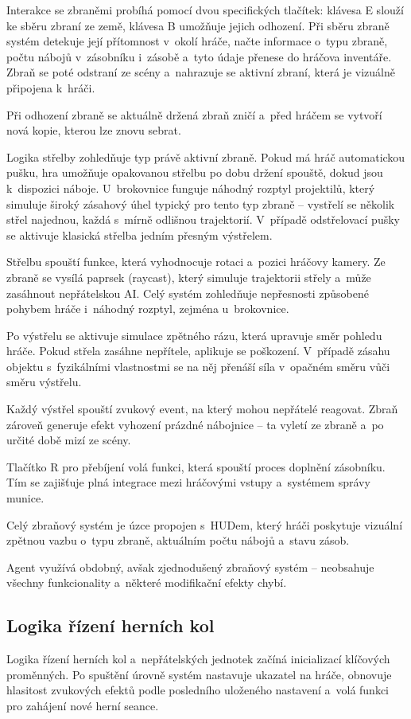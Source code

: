 Interakce se zbraněmi probíhá pomocí dvou specifických tlačítek: klávesa E slouží ke sběru zbraní ze země, klávesa B umožňuje jejich odhození. Při sběru zbraně systém detekuje její přítomnost v~okolí hráče, načte informace o~typu zbraně, počtu nábojů v~zásobníku i~zásobě a~tyto údaje přenese do hráčova inventáře. Zbraň se poté odstraní ze scény a~nahrazuje se aktivní zbraní, která je vizuálně připojena k~hráči.

Při odhození zbraně se aktuálně držená zbraň zničí a~před hráčem se vytvoří nová kopie, kterou lze znovu sebrat.

Logika střelby zohledňuje typ právě aktivní zbraně. Pokud má hráč automatickou pušku, hra umožňuje opakovanou střelbu po dobu držení spouště, dokud jsou k~dispozici náboje. U~brokovnice funguje náhodný rozptyl projektilů, který simuluje široký zásahový úhel typický pro tento typ zbraně – vystřelí se několik střel najednou, každá s~mírně odlišnou trajektorií. V~případě odstřelovací pušky se aktivuje klasická střelba jedním přesným výstřelem.

Střelbu spouští funkce, která vyhodnocuje rotaci a~pozici hráčovy kamery. Ze zbraně se vysílá paprsek (raycast), který simuluje trajektorii střely a~může zasáhnout nepřátelskou AI. Celý systém zohledňuje nepřesnosti způsobené pohybem hráče i~náhodný rozptyl, zejména u~brokovnice.

Po výstřelu se aktivuje simulace zpětného rázu, která upravuje směr pohledu hráče. Pokud střela zasáhne nepřítele, aplikuje se poškození. V~případě zásahu objektu s~fyzikálními vlastnostmi se na něj přenáší síla v~opačném směru vůči směru výstřelu.

Každý výstřel spouští zvukový event, na který mohou nepřátelé reagovat. Zbraň zároveň generuje efekt vyhození prázdné nábojnice – ta vyletí ze zbraně a~po určité době mizí ze scény.

Tlačítko R pro přebíjení volá funkci, která spouští proces doplnění zásobníku. Tím se zajišťuje plná integrace mezi hráčovými vstupy a~systémem správy munice.

Celý zbraňový systém je úzce propojen s~HUDem, který hráči poskytuje vizuální zpětnou vazbu o~typu zbraně, aktuálním počtu nábojů a~stavu zásob.

Agent využívá obdobný, avšak zjednodušený zbraňový systém – neobsahuje všechny funkcionality a~některé modifikační efekty chybí.

\subsection{Logika řízení herních kol}
Logika řízení herních kol a~nepřátelských jednotek začíná inicializací klíčových proměnných. Po spuštění úrovně systém nastavuje ukazatel na hráče, obnovuje hlasitost zvukových efektů podle posledního uloženého nastavení a~volá funkci pro zahájení nové herní seance.

